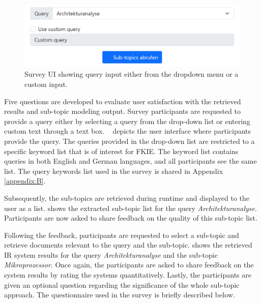 \begin{figure}[h]
	\centering
	\includegraphics[width=.8\textwidth]{images/survey/query_input.png}
	\caption[Query input from the user.]{Survey UI showing query input either from the dropdown menu or a custom input. \label{fig:survey_question_1}}
\end{figure}

Five questions are developed to evaluate user satisfaction with the retrieved results and sub-topic modeling output. Survey participants are requested to provide a query either by selecting a query from the drop-down list or entering custom text through a text box. ~ depicts the user interface where participants provide the query. The queries provided in the drop-down list are restricted to a specific keyword list that is of interest for \ac{FKIE}. The keyword list contains queries in both English and German languages, and all participants see the same list. The query keywords list used in the survey is shared in Appendix \ref{appendix:B}.



Subsequently, the sub-topics are retrieved during runtime and displayed to the user as a list.  shows the extracted sub-topic list for the query \emph{Architekturanalyse}. Participants are now asked to share feedback on the quality of this sub-topic list.


Following the feedback, participants are requested to select a sub-topic and retrieve documents relevant to the query and the sub-topic.   shows the retrieved \ac{IR} system results for the query \emph{Architekturanalyse} and the sub-topic \emph{Mikroprozessor}. Once again, the participants are asked to share feedback on the system results by rating the systems quantitatively. Lastly, the participants are given an optional question regarding the significance of the whole sub-topic approach. The questionnaire used in the survey is briefly described below.


